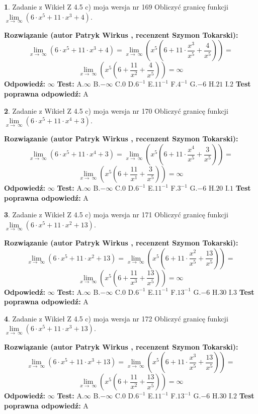 \documentclass[12pt, a4paper]{article}
\theoremstyle{definition} %
\newtheorem{zad}{}
\newcommand{\zadStart}[1]{\begin{zad}#1\newline}
\newcommand{\zadStop}{\end{zad}}
\newcommand{\rozwStart}[2]{\noindent \textbf{Rozwiązanie (autor #1 , recenzent #2): }\newline}
\newcommand{\rozwStop}{\newline}
\newcommand{\odpStart}{\noindent \textbf{Odpowiedź:}\newline}
\newcommand{\odpStop}{\newline}
\newcommand{\testStart}{\noindent \textbf{Test:}\newline}
\newcommand{\testStop}{\newline}
\newcommand{\kluczStart}{\noindent \textbf{Test poprawna odpowiedź:}\newline}
\newcommand{\kluczStop}{\newline}
\begin{document}
\zadStart{Zadanie z Wikieł Z 4.5 c) moja wersja nr 169}
Obliczyć granicę funkcji  $\lim\limits_{x\to\ \infty}(6 \cdot x^{5}+11 \cdot x^{3}+4)$.
\zadStop
\rozwStart{Patryk Wirkus}{Szymon Tokarski}
$$\lim\limits_{x\to\ \infty}(6 \cdot x^{5}+11 \cdot x^{3}+4) = \lim\limits_{x\to\ \infty}(x^{5}(6 +11 \cdot \frac{x^{3}}{x^{5}}+\frac{4}{x^{5}})) =$$ $$\lim\limits_{x\to\ \infty}(x^{5}(6 +\frac{11}{x^{2}}+\frac{4}{x^{5}})) =\infty$$
\rozwStop
\odpStart
$\infty$
\odpStop
\testStart
A.$\infty$ B.$-\infty$ C.$0$ D.$6^{-1}$ E.$11^{-1}$
F.$4^{-1}$ G.$-6$
H.$21$
I.$2$
\testStop
\kluczStart
A
\kluczStop



\zadStart{Zadanie z Wikieł Z 4.5 c) moja wersja nr 170}
Obliczyć granicę funkcji  $\lim\limits_{x\to\ \infty}(6 \cdot x^{5}+11 \cdot x^{4}+3)$.
\zadStop
\rozwStart{Patryk Wirkus}{Szymon Tokarski}
$$\lim\limits_{x\to\ \infty}(6 \cdot x^{5}+11 \cdot x^{4}+3) = \lim\limits_{x\to\ \infty}(x^{5}(6 +11 \cdot \frac{x^{4}}{x^{5}}+\frac{3}{x^{5}})) =$$ $$\lim\limits_{x\to\ \infty}(x^{5}(6 +\frac{11}{x^{1}}+\frac{3}{x^{5}})) =\infty$$
\rozwStop
\odpStart
$\infty$
\odpStop
\testStart
A.$\infty$ B.$-\infty$ C.$0$ D.$6^{-1}$ E.$11^{-1}$
F.$3^{-1}$ G.$-6$
H.$20$
I.$1$
\testStop
\kluczStart
A
\kluczStop



\zadStart{Zadanie z Wikieł Z 4.5 c) moja wersja nr 171}
Obliczyć granicę funkcji  $\lim\limits_{x\to\ \infty}(6 \cdot x^{5}+11 \cdot x^{2}+13)$.
\zadStop
\rozwStart{Patryk Wirkus}{Szymon Tokarski}
$$\lim\limits_{x\to\ \infty}(6 \cdot x^{5}+11 \cdot x^{2}+13) = \lim\limits_{x\to\ \infty}(x^{5}(6 +11 \cdot \frac{x^{2}}{x^{5}}+\frac{13}{x^{5}})) =$$ $$\lim\limits_{x\to\ \infty}(x^{5}(6 +\frac{11}{x^{3}}+\frac{13}{x^{5}})) =\infty$$
\rozwStop
\odpStart
$\infty$
\odpStop
\testStart
A.$\infty$ B.$-\infty$ C.$0$ D.$6^{-1}$ E.$11^{-1}$
F.$13^{-1}$ G.$-6$
H.$30$
I.$3$
\testStop
\kluczStart
A
\kluczStop



\zadStart{Zadanie z Wikieł Z 4.5 c) moja wersja nr 172}
Obliczyć granicę funkcji  $\lim\limits_{x\to\ \infty}(6 \cdot x^{5}+11 \cdot x^{3}+13)$.
\zadStop
\rozwStart{Patryk Wirkus}{Szymon Tokarski}
$$\lim\limits_{x\to\ \infty}(6 \cdot x^{5}+11 \cdot x^{3}+13) = \lim\limits_{x\to\ \infty}(x^{5}(6 +11 \cdot \frac{x^{3}}{x^{5}}+\frac{13}{x^{5}})) =$$ $$\lim\limits_{x\to\ \infty}(x^{5}(6 +\frac{11}{x^{2}}+\frac{13}{x^{5}})) =\infty$$
\rozwStop
\odpStart
$\infty$
\odpStop
\testStart
A.$\infty$ B.$-\infty$ C.$0$ D.$6^{-1}$ E.$11^{-1}$
F.$13^{-1}$ G.$-6$
H.$30$
I.$2$
\testStop
\kluczStart
A
\kluczStop
\end{document}
